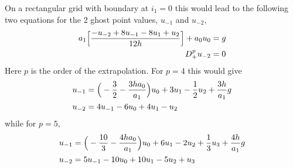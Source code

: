 On a rectangular grid with boundary at $i_1=0$ this would lead to the following two equations
for the 2 ghost point values, $u_{-1}$ and $u_{-2}$,
\begin{align*}
   a_1\Big[ {-u_{-2} + 8 u_{-1} - 8 u_{1} + u_2 \over 12 h } \Big] + a_0 u_0 &= g  \\
   D_+^p u_{-2} &= 0
\end{align*}
Here $p$ is the order of the extrapolation.
For $p=4$ this would give
\begin{align*}
u_{-1} &= \Big( -{3\over 2} - {3 h a_0 \over a_1 } \Big) u_0 + 3 u_1 -{1\over2} u_2 + {3 h \over a_1 } g\\
u_{-2} &= 4 u_{-1} - 6 u_0 + 4 u_1 - u_2
\end{align*}
while for $p=5$,
\begin{align*}
u_{-1} &= \Big( -{10\over 3} - {4 h a_0 \over a_1 } \Big) u_0 + 6 u_1 - 2 u_2 + {1\over 3} u_3 + {4 h \over a_1 } g\\
u_{-2} &= 5 u_{-1} - 10 u_0 + 10 u_1 -5 u_2 + u_3
\end{align*}


